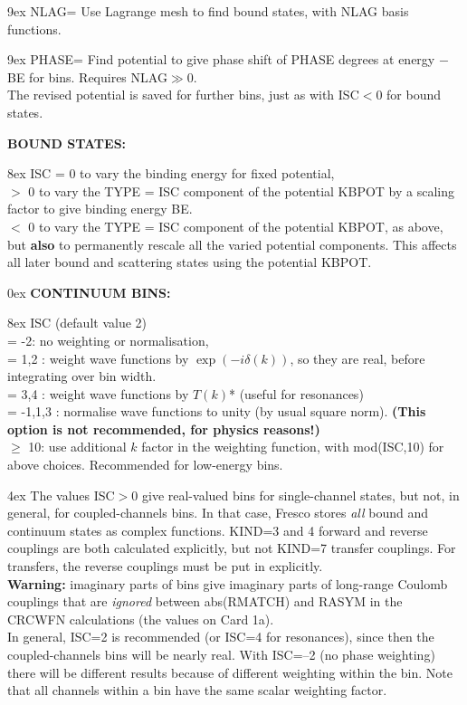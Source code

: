 \documentclass[11pt]{article}
\begin{document}
\hangindent 9ex
NLAG= Use Lagrange mesh to find bound states, with NLAG basis functions.

\hangindent 9ex
PHASE= Find potential to give phase shift of PHASE degrees at energy $-$BE for bins. Requires NLAG$\gg$0. \\
The revised potential is saved for further bins, just as with ISC$<$0 for bound states.


\bigskip
{\bf BOUND STATES:}


\hangindent 8ex  ISC
      = 0 to vary the binding energy for fixed potential,
\\  $>$ 0 to vary the TYPE = ISC component of the potential KBPOT
by a scaling factor to give binding energy BE.
\\  $<$ 0 to vary the TYPE = ISC component of the potential KBPOT,
as above, but {\bf also} to permanently rescale all the varied potential
components. This affects all later bound and scattering states using
the potential KBPOT.



\bigskip

\hangindent 0ex
{\bf CONTINUUM BINS:}


\hangindent 8ex  ISC   (default value 2)\\
      = -2: no weighting or normalisation,
\\  = 1,2 : weight wave functions by $\exp(-i\delta(k))$,
so they are real, before integrating over bin width.
\\  = 3,4 : weight wave functions by $T(k)$* (useful for resonances)
\\  = -1,1,3 : normalise wave functions to unity (by usual square norm).
{\bf (This option is not recommended, for physics reasons!)}
\\  $\geq$ 10: use additional $k$ factor in the weighting function, with
mod(ISC,10) for above choices. Recommended for low-energy  bins.

\hangindent 4ex
The values ISC$>$0 give real-valued bins for single-channel states,
but not, in general, for coupled-channels bins. In that case, Fresco stores
{\em all} bound and continuum states as complex functions.
KIND=3 and 4 forward and reverse couplings are both calculated
explicitly, but not KIND=7 transfer couplings. For transfers, the
reverse couplings must be put in explicitly.\\
{\bf Warning:} imaginary parts of bins give imaginary parts of long-range
Coulomb couplings that are {\em ignored} between abs(RMATCH) and RASYM
in the CRCWFN calculations (the values on Card 1a).\\
In general, ISC=2 is recommended (or ISC=4 for resonances), since then
the coupled-channels bins will be nearly real. With ISC=--2 (no phase weighting)
there will be  different results because of different weighting within the
bin. Note that all channels within a bin have the same scalar
weighting factor.
\end{document}
